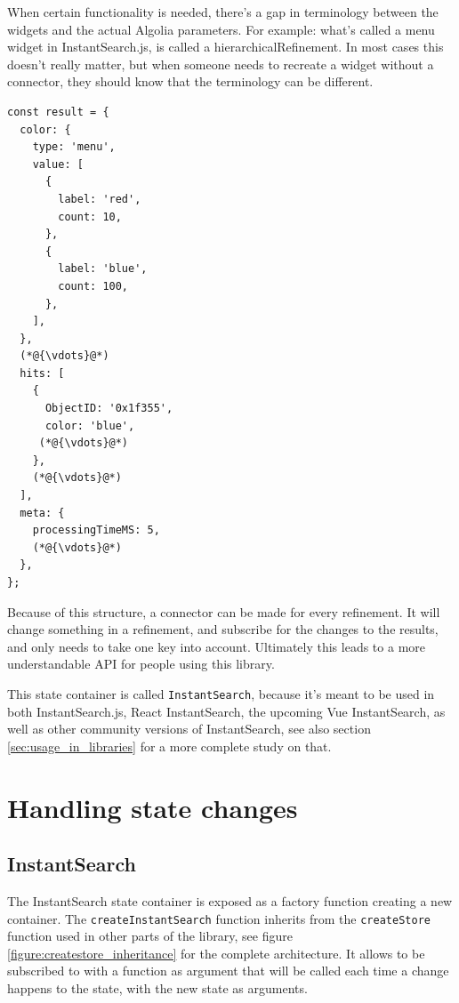 When certain functionality is needed, there's a gap in terminology between the widgets and the actual Algolia parameters. For example: what's called a menu widget in InstantSearch.js, is called a hierarchicalRefinement. In most cases this doesn't really matter, but when someone needs to recreate a widget without a connector, they should know that the terminology can be different.

\begin{minipage}{\linewidth}
\begin{lstlisting}[caption={Results container in the InstantSearch Core state},label={lst:is-core-state-4}]
const result = {
  color: {
    type: 'menu',
    value: [
      {
        label: 'red',
        count: 10,
      },
      {
        label: 'blue',
        count: 100,
      },
    ],
  },
  (*@{\vdots}@*)
  hits: [
    {
      ObjectID: '0x1f355',
      color: 'blue',
     (*@{\vdots}@*)
    },
    (*@{\vdots}@*)
  ],
  meta: { 
    processingTimeMS: 5,
    (*@{\vdots}@*)
  },
};
\end{lstlisting}
\end{minipage}

Because of this structure, a connector can be made for every refinement. It will change something in a refinement, and subscribe for the changes to the results, and only needs to take one key into account. Ultimately this leads to a more understandable API for people using this library.

This state container is called {\tt InstantSearch}, because it's meant to be used in both InstantSearch.js, React InstantSearch, the upcoming Vue InstantSearch, as well as other community versions of InstantSearch, see also section \ref{sec:usage_in_libraries} for a more complete study on that.


\section{Handling state changes} %
\label{sec:handling_state_changes}

\subsection{InstantSearch}
\label{ssec:instantsearch}

The InstantSearch state container is exposed as a factory function creating a new container. The {\tt createInstantSearch} function inherits from the {\tt createStore} function used in other parts of the library, see figure \ref{figure:createstore_inheritance} for the complete architecture. It allows to be subscribed to with a function as argument that will be called each time a change happens to the state, with the new state as arguments.

